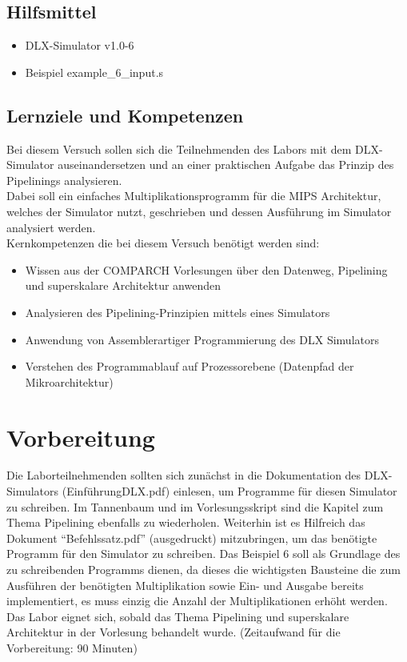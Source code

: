 \documentclass[a4paper,ngerman]{scrartcl}
\begin{document}
\subsection{Hilfsmittel}
\begin{itemize}
    \item DLX-Simulator v1.0-6
    \item Beispiel example\_6\_input.s
\end{itemize}

\subsection{Lernziele und Kompetenzen}
\label{kompetenzen}
Bei diesem Versuch sollen sich die Teilnehmenden des Labors mit dem DLX-Simulator auseinandersetzen und an einer praktischen Aufgabe das Prinzip des Pipelinings analysieren. \\
Dabei soll ein einfaches Multiplikationsprogramm für die MIPS Architektur, welches der Simulator nutzt, geschrieben und dessen Ausführung im Simulator analysiert werden. \\
Kernkompetenzen die bei diesem Versuch benötigt werden sind:

\begin{itemize}
    \item Wissen aus der COMPARCH Vorlesungen über den Datenweg, Pipelining und superskalare Architektur anwenden
    \item Analysieren des Pipelining-Prinzipien mittels eines Simulators
    \item Anwendung von Assemblerartiger Programmierung des DLX Simulators
    \item Verstehen des Programmablauf auf Prozessorebene (Datenpfad der Mikroarchitektur)
\end{itemize}

\section{Vorbereitung}
Die Laborteilnehmenden sollten sich zunächst in die Dokumentation des DLX-Simulators (EinführungDLX.pdf) einlesen, um Programme für diesen Simulator zu schreiben.
Im Tannenbaum und im Vorlesungsskript sind die Kapitel zum Thema Pipelining ebenfalls zu wiederholen.
Weiterhin ist es Hilfreich das Dokument \enquote{Befehlssatz.pdf} (ausgedruckt) mitzubringen, um das benötigte Programm für den Simulator zu schreiben.
Das Beispiel 6 soll als Grundlage des zu schreibenden Programms dienen, da dieses die wichtigsten Bausteine die zum Ausführen der benötigten Multiplikation sowie Ein- und Ausgabe bereits implementiert, es muss einzig die Anzahl der Multiplikationen erhöht werden. 
Das Labor eignet sich, sobald das Thema Pipelining und superskalare Architektur in der Vorlesung behandelt wurde.
\newline (Zeitaufwand für die Vorbereitung: 90 Minuten)
\end{document}
